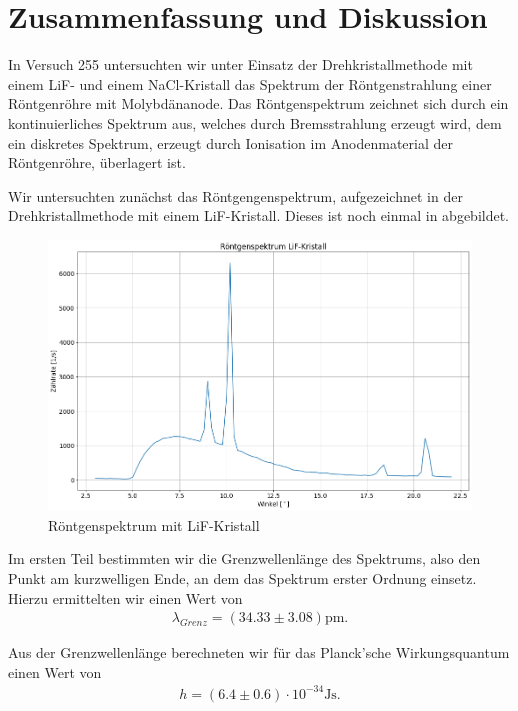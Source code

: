 \section{Zusammenfassung und Diskussion}

In Versuch 255 untersuchten wir unter Einsatz der Drehkristallmethode mit einem LiF- und einem NaCl-Kristall das Spektrum der Röntgenstrahlung einer Röntgenröhre mit Molybdänanode. Das Röntgenspektrum zeichnet sich durch ein kontinuierliches Spektrum aus, welches durch Bremsstrahlung erzeugt wird, dem ein diskretes Spektrum, erzeugt durch Ionisation im Anodenmaterial der Röntgenröhre, überlagert ist.

Wir untersuchten zunächst das Röntgengenspektrum, aufgezeichnet in der Drehkristallmethode mit einem LiF-Kristall. Dieses ist noch einmal in  abgebildet.

\begin{figure}[H]
  \centering
  \includegraphics[width=.9\textwidth]{files/plots/spektrum_lif_komplett.png}
  \caption{Röntgenspektrum mit LiF-Kristall}
  \label{fig:spektrum_lif_komplett_zsmf}
\end{figure}

Im ersten Teil bestimmten wir die Grenzwellenlänge des Spektrums, also den Punkt am kurzwelligen Ende, an dem das Spektrum erster Ordnung einsetz. Hierzu ermittelten wir einen Wert von
\begin{align}
  \lambda_{Grenz} = (34.33 \pm 3.08) \si{\pico\meter}.
\end{align}

Aus der Grenzwellenlänge berechneten wir für das Planck'sche Wirkungsquantum einen Wert von
\begin{align}
  h = (6.4 \pm 0.6) \cdot 10^{-34} \si{\joule\second}.
\end{align}


